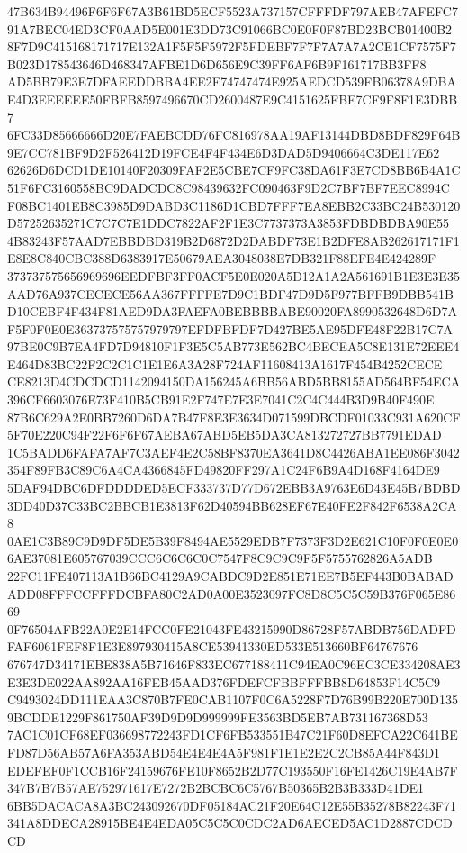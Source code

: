 \documentclass[UTF8,fontset=fandol,zihao=-4,a4paper]{ctexart}
\begin{document}
{{47B634B94496F6F6F67A3B61BD5ECF5523A737157CFFFDF797AEB47AFEFC791A7BEC04ED3CF0AAD5E001E3DD73C91066BC0E0F0F87BD23BCB01400B2
8F7D9C415168171717E132A1F5F5F5972F5FDEBF7F7F7A7A7A2CE1CF7575F7B023D178543646D468347AFBE1D6D656E9C39FF6AF6B9F161717BB3FF8
AD5BB79E3E7DFAEEDDBBA4EE2E74747474E925AEDCD539FB06378A9DBAE4D3EEEEEE50FBFB8597496670CD2600487E9C4151625FBE7CF9F8F1E3DBB7
6FC33D85666666D20E7FAEBCDD76FC816978AA19AF13144DBD8BDF829F64B9E7CC781BF9D2F526412D19FCE4F4F434E6D3DAD5D9406664C3DE117E62
62626D6DCD1DE10140F20309FAF2E5CBE7CF9FC38DA61F3E7CD8BB6B4A1C51F6FC3160558BC9DADCDC8C98439632FC090463F9D2C7BF7BF7EEC8994C
F08BC1401EB8C3985D9DABD3C1186D1CBD7FFF7EA8EBB2C33BC24B530120D57252635271C7C7C7E1DDC7822AF2F1E3C7737373A3853FDBDBDBA90E55
4B83243F57AAD7EBBDBD319B2D6872D2DABDF73E1B2DFE8AB262617171F1E8E8C840CBC388D6383917E50679AEA3048038E7DB321F88EFE4E424289F
373737575656969696EEDFBF3FF0ACF5E0E020A5D12A1A2A561691B1E3E3E35AAD76A937CECECE56AA367FFFFE7D9C1BDF47D9D5F977BFFB9DBB541B
D10CEBF4F434F81AED9DA3FAEFA0BEBBBBABE90020FA8990532648D6D7AF5F0F0E0E363737575757979797EFDFBFDF7D427BE5AE95DFE48F22B17C7A
97BE0C9B7EA4FD7D94810F1F3E5C5AB773E562BC4BECEA5C8E131E72EEE4E464D83BC22F2C2C1C1E1E6A3A28F724AF11608413A1617F454B4252CECE
CE8213D4CDCDCD1142094150DA156245A6BB56ABD5BB8155AD564BF54ECA396CF6603076E73F410B5CB91E2F747E7E3E7041C2C4C444B3D9B40F490E
87B6C629A2E0BB7260D6DA7B47F8E3E3634D071599DBCDF01033C931A620CF5F70E220C94F22F6F6F67AEBA67ABD5EB5DA3CA813272727BB7791EDAD
1C5BADD6FAFA7AF7C3AEF4E2C58BF8370EA3641D8C4426ABA1EE086F3042354F89FB3C89C6A4CA4366845FD49820FF297A1C24F6B9A4D168F4164DE9
5DAF94DBC6DFDDDDED5ECF333737D77D672EBB3A9763E6D43E45B7BDBD3DD40D37C33BC2BBCB1E3813F62D40594BB628EF67E40FE2F842F6538A2CA8
0AE1C3B89C9D9DF5DE5B39F8494AE5529EDB7F7373F3D2E621C10F0F0E0E06AE37081E605767039CCC6C6C6C0C7547F8C9C9C9F5F5755762826A5ADB
22FC11FE407113A1B66BC4129A9CABDC9D2E851E71EE7B5EF443B0BABADADD08FFFCCFFFDCBFA80C2AD0A00E3523097FC8D8C5C5C59B376F065E8669
0F76504AFB22A0E2E14FCC0FE21043FE43215990D86728F57ABDB756DADFDFAF6061FEF8F1E3E897930415A8CE53941330ED533E513660BF64767676
676747D34171EBE838A5B71646F833EC677188411C94EA0C96EC3CE334208AE3E3E3DE022AA892AA16FEB45AAD376FDEFCFBBFFFBB8D64853F14C5C9
C9493024DD111EAA3C870B7FE0CAB1107F0C6A5228F7D76B99B220E700D1359BCDDE1229F861750AF39D9D9D999999FE3563BD5EB7AB731167368D53
7AC1C01CF68EF036698772243FD1CF6FB533551B47C21F60D8EFCA22C641BEFD87D56AB57A6FA353ABD54E4E4E4A5F981F1E1E2E2C2CB85A44F843D1
EDEFEF0F1CCB16F24159676FE10F8652B2D77C193550F16FE1426C19E4AB7F347B7B7B57AE752971617E7272B2BCBC6C5767B50365B2B3B333D41DE1
6BB5DACACA8A3BC243092670DF05184AC21F20E64C12E55B35278B82243F71341A8DDECA28915BE4E4EDA05C5C5C0CDC2AD6AECED5AC1D2887CDCDCD
}}
\end{document}
